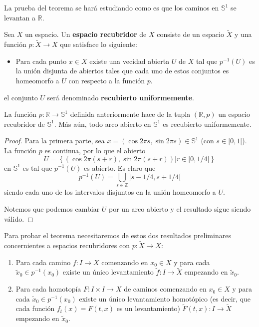 \documentclass[12pt]{report}
\theoremstyle{largebreak}
\newcommand\cf[3]{\ensuremath{#1:#2\rightarrow#3}}
\begin{document}
    La prueba del teorema se hará estudiando como es que los caminos en $\mathbb{S}^1$ se levantan a $\mathbb{R}$.

    \begin{mydef}
        Sea $X$ un espacio. Un \textbf{espacio recubridor} de $X$ consiste de un espacio $\widetilde{X}$ y una función $\cf{p}{\widetilde{X}}{X}$ que satisface lo siguiente:
        \begin{itemize}
            \item Para cada punto $x\in X$ existe una vecidad abierta $U$ de $X$ tal que $p^{-1}(U)$ es la unión disjunta de abiertos tales que cada uno de estos conjuntos es homeomorfo a $U$ con respecto a la función $p$.
        \end{itemize}
        el conjunto $U$ será denominado \textbf{recubierto uniformemente}.
    \end{mydef}

    \begin{propo}
        La función $\cf{p}{\mathbb{R}}{\mathbb{S}^1}$ definida anteriormente hace de la tupla $(\mathbb{R},p)$ un espacio recubridor de $\mathbb{S}^1$. Más aún, todo arco abierto en $\mathbb{S}^1$ es recubierto uniformemente.
    \end{propo}
    
    \begin{proof}
        Para la primera parte, sea $x=(\cos2\pi s,\sin2\pi s)\in\mathbb{S}^1$ (con $s\in[0,1[$). La función $p$ es continua, por lo que el abierto
        \begin{equation*}
            U=\left\{(\cos2\pi(s+r),\sin2\pi (s+r))\Big|r\in[0,1/4[ \right\}
        \end{equation*}
        en $\mathbb{S}^1$ es tal que $p^{-1}(U)$ es abierto. Es claro que
        \begin{equation*}
            p^{-1}(U)=\bigcup_{ s\in\mathbb{Z}}]s-1/4,s+1/4[
        \end{equation*}
        siendo cada uno de los intervalos disjuntos en la unión homeomorfo a $U$.

        Notemos que podemos cambiar $U$ por un arco abierto y el resultado sigue siendo válido. 
    \end{proof}

    Para probar el teorema necesitaremos de estos dos resultados preliminares concernientes a espacios recubridores con $\cf{p}{\widetilde{X}}{X}$:

    \begin{enumerate}
        \item Para cada camino $\cf{f}{I}{X}$ comenzando en $x_0\in X$ y para cada $\widetilde{x}_0\in p^{-1}(x_0)$ existe un único levantamiento $\cf{\widetilde{f}}{I}{\widetilde{X}}$ empezando en $\widetilde{x}_0$.
        \item Para cada homotopía $\cf{F}{I\times I}{X}$ de caminos comenzando en $x_0\in X$ y para cada $\widetilde{x}_0\in p^{-1}(x_0)$ existe un único levantamiento homotópico (es decir, que cada función $f_t(x)=F(t,x)$ es un levantamiento) $\cf{\widetilde{F}(t,x)}{I}{\widetilde{X}}$ empezando en $\widetilde{x}_0$.
    \end{enumerate}
\end{document}
